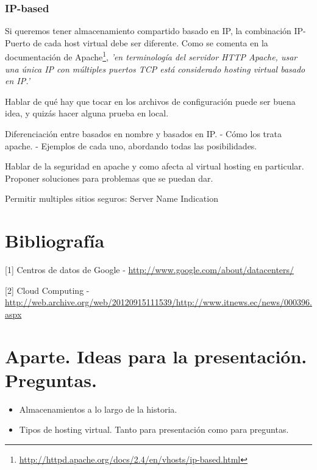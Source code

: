\documentclass[a4paper, 10pt]{article} %
\begin{document}
\subsubsection{IP-based}

Si queremos tener almacenamiento compartido basado en IP, la combinación IP-Puerto de cada host virtual debe ser diferente. Como se comenta en la documentación de Apache\footnote{\url{http://httpd.apache.org/docs/2.4/en/vhosts/ip-based.html}}, \textit{'en terminología del servidor HTTP Apache, usar una única IP con múltiples puertos TCP está considerado hosting virtual basado en IP.'}

Hablar de qué hay que tocar en los archivos de configuración puede ser buena idea, y quizás hacer alguna prueba en local. 

Diferenciación entre basados en nombre y basados en IP. 
	- Cómo los trata apache. 
	- Ejemplos de cada uno, abordando todas las posibilidades. 

Hablar de la seguridad en apache y como afecta al virtual hosting en particular. Proponer soluciones para problemas que se puedan dar. 

Permitir multiples sitios seguros: Server Name Indication 

\section{Bibliografía}

[1] Centros de datos de Google - \url{http://www.google.com/about/datacenters/}

[2] Cloud Computing - \url{http://web.archive.org/web/20120915111539/http://www.itnews.ec/news/000396.aspx}

\section{Aparte. Ideas para la presentación. Preguntas.}
\begin{itemize}
\item Almacenamientos a lo largo de la historia. 
\item Tipos de hosting virtual. Tanto para presentación como para preguntas. 
\end{itemize}
\end{document}
